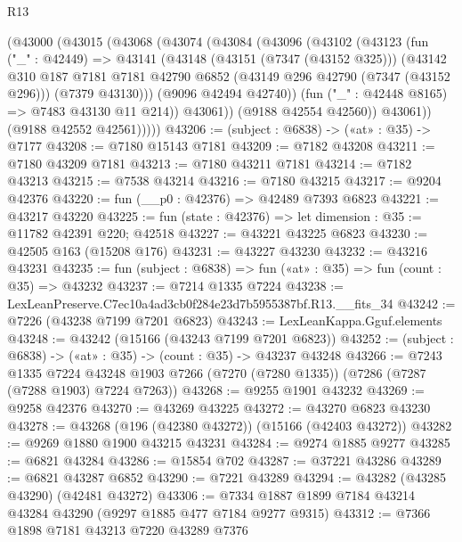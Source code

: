 \begin{lexlean}{R13}
\begin{coremodule}
        (@43000
          (@43015
            (@43068
              (@43074
                (@43084
                  (@43096
                    (@43102
                      (@43123
                        (fun ("_" : @42449) =>
                        @43141
                          (@43148
                            (@43151 (@7347 (@43152 @325)))
                            (@43142
                              @310
                              @187
                              @7181
                              @7181
                              @42790
                              @6852
                              (@43149 @296 @42790 (@7347 (@43152 @296)))
                              (@7379 @43130)))
                          (@9096 @42494 @42740))
                        (fun ("_" : @42448 @8165) => @7483 @43130 @11 @214))
                      @43061))
                  (@9188 @42554 @42560))
                @43061))
            (@9188 @42552 @42561)))))
@43206 := (subject : @6838) -> («at» : @35) -> @7177
@43208 := @7180 @15143 @7181
@43209 := @7182 @43208
@43211 := @7180 @43209 @7181
@43213 := @7180 @43211 @7181
@43214 := @7182 @43213
@43215 := @7538 @43214
@43216 := @7180 @43215
@43217 := @9204 @42376
@43220 := fun (__p0 : @42376) => @42489 @7393 @6823
@43221 := @43217 @43220
@43225 := fun (state : @42376) => let dimension : @35 := @11782 @42391 @220; @42518
@43227 := @43221 @43225 @6823
@43230 := @42505 @163 (@15208 @176)
@43231 := @43227 @43230
@43232 := @43216 @43231
@43235 := fun (subject : @6838) => fun («at» : @35) => fun (count : @35) => @43232
@43237 := @7214 @1335 @7224
@43238 := LexLeanPreserve.C7ec10a4ad3cb0f284e23d7b5955387bf.R13.__fits_34
@43242 := @7226 (@43238 @7199 @7201 @6823)
@43243 := LexLeanKappa.Gguf.elements
@43248 := @43242 (@15166 (@43243 @7199 @7201 @6823))
@43252 := (subject : @6838) -> («at» : @35) -> (count : @35) -> @43237 @43248
@43266 := @7243
    @1335
    @7224
    @43248
    @1903
    @7266
    (@7270 (@7280 @1335))
    (@7286 (@7287 (@7288 @1903) @7224 @7263))
@43268 := @9255 @1901 @43232
@43269 := @9258 @42376
@43270 := @43269 @43225
@43272 := @43270 @6823 @43230
@43278 := @43268 (@196 (@42380 @43272)) (@15166 (@42403 @43272))
@43282 := @9269 @1880 @1900 @43215 @43231
@43284 := @9274 @1885 @9277
@43285 := @6821 @43284
@43286 := @15854 @702
@43287 := @37221 @43286
@43289 := @6821 @43287 @6852
@43290 := @7221 @43289
@43294 := @43282 (@43285 @43290) (@42481 @43272)
@43306 := @7334 @1887 @1899 @7184 @43214 @43284 @43290 (@9297 @1885 @477 @7184 @9277 @9315)
@43312 := @7366 @1898 @7181 @43213 @7220 @43289 @7376

\end{coremodule}
\end{lexlean}
